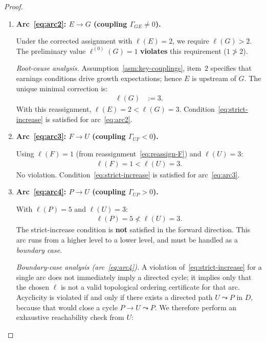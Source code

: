\documentclass[12pt,openany]{book}
\newcommand{\calE}{\mathcal{E}}
\newcommand{\calF}{\mathcal{F}}
\newcommand{\calG}{\mathcal{G}}
\newcommand{\calP}{\mathcal{P}}
\newcommand{\calU}{\mathcal{U}}
\numberwithin{equation}{chapter}
\theoremstyle{plain}
\theoremstyle{definition}
\theoremstyle{remark}
\def\mathcal#1{#1}%
\begin{document}
\begin{proof}
\begin{enumerate}
  \item \textbf{Arc~\eqref{eq:arc2}:
        $\calE \to \calG$
        (coupling $\Gamma_{\calG\calE} \neq 0$).}

        Under the corrected assignment with
        $\ell(\calE) = 2$, we require $\ell(\calG) > 2$.
        The preliminary value $\ell^{(0)}(\calG) = 1$
        \textbf{violates} this requirement
        ($1 \not> 2$).

        \emph{Root-cause analysis.}
        Assumption~\ref{asm:key-couplings}, item~2
        specifies that earnings conditions drive growth
        expectations; hence $\calE$ is upstream of
        $\calG$.  The unique minimal correction is:
        \begin{align}
          \ell(\calG) &:= 3. \label{eq:reassign-G}
        \end{align}
        With this reassignment,
        $\ell(\calE) = 2 < \ell(\calG) = 3$.
        Condition~\eqref{eq:strict-increase} is satisfied
        for arc~\eqref{eq:arc2}.  \checkmark

  \item \textbf{Arc~\eqref{eq:arc3}:
        $\calF \to \calU$
        (coupling $\Gamma_{\calU\calF} < 0$).}

        Using $\ell(\calF) = 1$ (from
        reassignment~\eqref{eq:reassign-F}) and
        $\ell(\calU) = 3$:
        \begin{align}
          \ell(\calF) = 1 < \ell(\calU) = 3.
          \label{eq:check-arc3}
        \end{align}
        No violation.  Condition~\eqref{eq:strict-increase}
        is satisfied for arc~\eqref{eq:arc3}.  \checkmark

  \item \textbf{Arc~\eqref{eq:arc4}:
        $\calP \to \calU$
        (coupling $\Gamma_{\calU\calP} > 0$).}

        With $\ell(\calP) = 5$ and $\ell(\calU) = 3$:
        \begin{align}
          \ell(\calP) = 5 \not< \ell(\calU) = 3.
          \label{eq:violation-arc4}
        \end{align}
        The strict-increase condition is \textbf{not}
        satisfied in the forward direction.  This arc
        runs from a higher level to a lower level, and
        must be handled as a \emph{boundary case}.

        \emph{Boundary-case analysis (arc~\eqref{eq:arc4}).}
        A violation of~\eqref{eq:strict-increase} for a
        single arc does not immediately imply a directed
        cycle; it implies only that the chosen $\ell$ is not
        a valid topological ordering certificate for that
        arc.  Acyclicity is violated if and only if there
        exists a directed path
        $\calU \leadsto \calP$ in $\mathcal{D}$,
        because that would close a cycle
        $\calP \to \calU \leadsto \calP$.
        We therefore perform an exhaustive reachability
        check from $\calU$:


\end{enumerate}
\end{proof}
\end{document}
